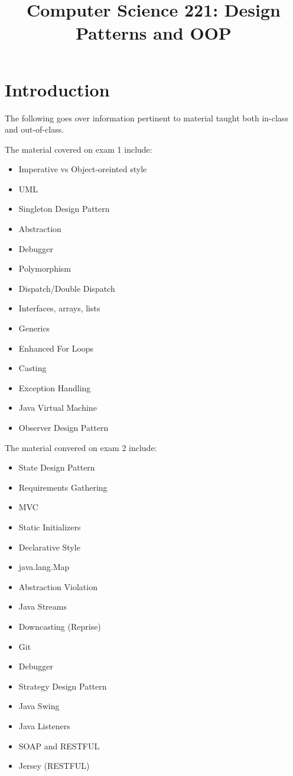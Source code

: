 \documentclass[a4paper, 11pt]{article}
\begin{document}
\title{Computer Science 221: Design Patterns and OOP}

\maketitle

\tableofcontents

\newpage

\section{Introduction}

    The following goes over information pertinent to material taught both in-class and out-of-class.

    The material covered on exam 1 include:

    \begin{itemize}
        \item Imperative vs Object-oreinted style
        \item UML
        \item Singleton Design Pattern
        \item Abstraction
        \item Debugger
        \item Polymorphism
        \item Dispatch/Double Dispatch
        \item Interfaces, arrays, lists
        \item Generics
        \item Enhanced For Loops
        \item Casting
        \item Exception Handling
        \item Java Virtual Machine
        \item Observer Design Pattern
    \end{itemize}

    The material convered on exam 2 include:

    \begin{itemize}
        \item State Design Pattern
        \item Requirements Gathering
        \item MVC
        \item Static Initializers
        \item Declarative Style
        \item java.lang.Map
        \item Abstraction Violation
        \item Java Streams
        \item Downcasting (Reprise)
        \item Git
        \item Debugger
        \item Strategy Design Pattern
        \item Java Swing
        \item Java Listeners
        \item SOAP and RESTFUL
        \item Jersey (RESTFUL)
    \end{itemize}
\end{document}
